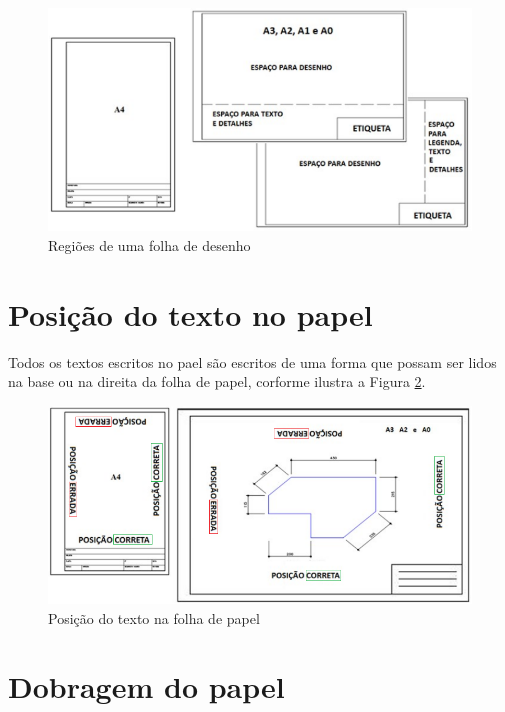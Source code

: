 \documentclass{article}
\begin{document}
\begin{figure} [H] %
\centering
\includegraphics[scale=0.65]{Fig/Figura_RegioesFolhaDesenho.png} 
\caption{Regiões de uma folha de desenho}
\label{fig_RegiosFolhaDesenho}
\end{figure}

\section{Posição do texto no papel}

\hspace{1cm} Todos os textos escritos no pael são escritos de uma forma que possam ser lidos na base ou na direita da folha de papel, corforme ilustra a Figura \ref{fig_PosicaoTexto}.

\begin{figure} [H] %
\centering
    \includegraphics[scale=0.7]{Fig/Figura_PosicaoTexto.png} 
\caption{Posição do texto na folha de papel}
\label{fig_PosicaoTexto}
\end{figure}

\section{Dobragem do papel}
\end{document}

